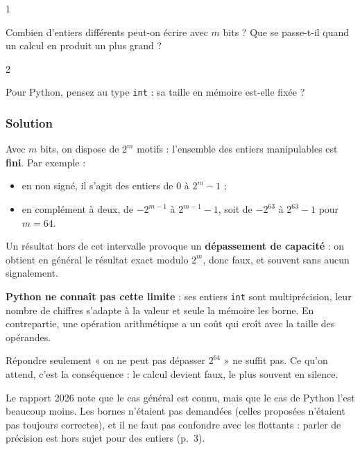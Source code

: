 \documentclass[11pt,a4paper]{article}
\providecommand{\tightlist}{\setlength{\itemsep}{0pt}\setlength{\parskip}{0pt}}
\begin{document}
\begin{indication}{1}

Combien d'entiers différents peut-on écrire avec \(m\) bits ? Que se passe-t-il quand un calcul en produit un plus grand ?

\end{indication}

\begin{indication}{2}

Pour Python, pensez au type \texttt{int} : sa taille en mémoire est-elle fixée ?

\end{indication}

\hypertarget{solution}{%
\subsubsection{Solution}\label{solution}}

Avec \(m\) bits, on dispose de \(2^m\) motifs : l'ensemble des entiers manipulables est \textbf{fini}. Par exemple :

\begin{itemize}
\tightlist
\item
  en non signé, il s'agit des entiers de \(0\) à \(2^m - 1\) ;
\item
  en complément à deux, de \(-2^{m-1}\) à \(2^{m-1} - 1\), soit de \(-2^{63}\) à \(2^{63}-1\) pour \(m = 64\).
\end{itemize}

Un résultat hors de cet intervalle provoque un \textbf{dépassement de capacité} : on obtient en général le résultat exact modulo \(2^m\), donc faux, et souvent sans aucun signalement.

\textbf{Python ne connaît pas cette limite} : ses entiers \texttt{int} sont multiprécision, leur nombre de chiffres s'adapte à la valeur et seule la mémoire les borne. En contrepartie, une opération arithmétique a un coût qui croît avec la taille des opérandes.

\begin{piege}

Répondre seulement « on ne peut pas dépasser \(2^{64}\) » ne suffit pas. Ce qu'on attend, c'est la conséquence : le calcul devient faux, le plus souvent en silence.

\end{piege}

\begin{jury}

Le rapport 2026 note que le cas général est connu, mais que le cas de Python l'est beaucoup moins. Les bornes n'étaient pas demandées (celles proposées n'étaient pas toujours correctes), et il ne faut pas confondre avec les flottants : parler de précision est hors sujet pour des entiers (p.~3).

\end{jury}
\end{document}
